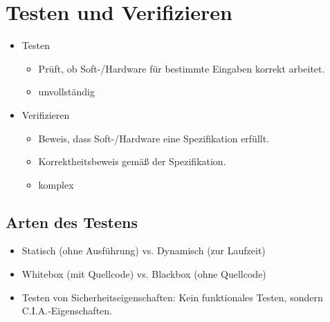 \documentclass[a4paper, 11pt, accentcolor = tud3b]{tudreport}
\begin{document}
        \section{Testen und Verifizieren}
            \begin{itemize}
            	\item Testen
	            	\begin{itemize}
	            		\item Prüft, ob Soft-/Hardware für bestimmte Eingaben korrekt arbeitet.
	            		\item unvollständig
	            	\end{itemize}
            	\item Verifizieren
	            	\begin{itemize}
	            		\item Beweis, dass Soft-/Hardware eine Spezifikation erfüllt.
	            		\item Korrektheitsbeweis gemäß der Spezifikation.
	            		\item komplex
	            	\end{itemize}
            \end{itemize}

            \subsection{Arten des Testens}
                \begin{itemize}
                	\item Statisch (ohne Ausführung) vs. Dynamisch (zur Laufzeit)
                	\item Whitebox (mit Quellcode) vs. Blackbox (ohne Quellcode)
                	\item Testen von Sicherheitseigenschaften: Kein funktionales Testen, sondern C.I.A.-Eigenschaften.
                \end{itemize}
\end{document}
